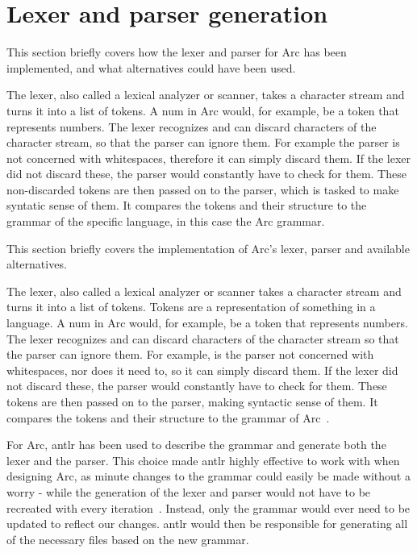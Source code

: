 \section{Lexer and parser generation}\label{sec:lexerandparsergen}
This section briefly covers how the lexer and parser for Arc has been implemented, and what alternatives could have been used.

The lexer, also called a lexical analyzer or scanner, takes a character stream and turns it into a list of tokens. A num in Arc would, for example, be a token that represents numbers. The lexer recognizes and can discard characters of the character stream, so that the parser can ignore them. For example the parser is not concerned with whitespaces, therefore it can simply discard them. If the lexer did not discard these, the parser would constantly have to check for them. These non-discarded tokens are then passed on to the parser, which is tasked to make syntatic sense of them. It compares the tokens and their structure to the grammar of the specific language, in this case the Arc grammar.

This section briefly covers the implementation of Arc's lexer, parser and available alternatives.

The lexer, also called a lexical analyzer or scanner takes a character stream and turns it into a list of tokens. Tokens are a representation of something in a language. A num in Arc would, for example, be a token that represents numbers. The lexer recognizes and can discard characters of the character stream so that the parser can ignore them. For example, is the parser not concerned with whitespaces, nor does it need to, so it can simply discard them. If the lexer did not discard these, the parser would constantly have to check for them. These tokens are then passed on to the parser, making syntactic sense of them. It compares the tokens and their structure to the grammar of Arc~\cite{Parr2014}.

For Arc, \gls{antlr} has been used to describe the grammar and generate both the lexer and the parser. This choice made \gls{antlr} highly effective to work with when designing Arc, as minute changes to the grammar could easily be made without a worry - while the generation of the lexer and parser would not have to be recreated with every iteration~\cite{Parr2014}. Instead, only the grammar would ever need to be updated to reflect our changes. \gls{antlr} would then be responsible for generating all of the necessary files based on the new grammar.

